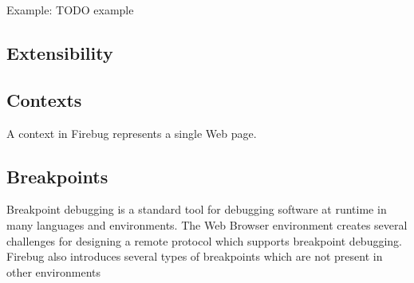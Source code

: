 Example:
TODO example


\subsection {Extensibility}

\subsection {Contexts}
A context in Firebug represents a single Web page.

\subsection {Breakpoints}
Breakpoint debugging is a standard tool for debugging software at runtime in
many languages and environments. The Web Browser environment creates several
challenges for designing a remote protocol which supports breakpoint debugging.
Firebug also introduces several types of breakpoints which are not present in
other environments \cite{jjb-www2010}
